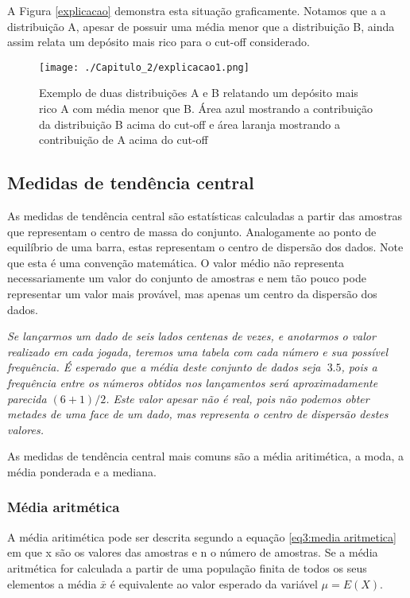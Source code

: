 A Figura \eqref{explicacao} demonstra esta situação graficamente. Notamos que a a distribuição A, apesar de possuir uma média menor que a distribuição B, ainda assim relata um depósito mais rico para o cut-off considerado. 

\FloatBarrier
\begin{figure}[!htb]
\centering
\texttt{[image: ./Capitulo\_2/explicacao1.png]}	
\caption{Exemplo de duas distribuições A e B relatando um depósito mais rico A com média menor que B. Área azul mostrando a contribuição da distribuição B acima do cut-off e área laranja mostrando a contribuição de A acima do cut-off}
\label{explicacao}
\end{figure}
\FloatBarrier

\subsection{Medidas de tendência central} 

As medidas de tendência central são estatísticas calculadas a partir das amostras que representam o centro de massa do conjunto. Analogamente ao ponto de equilíbrio de uma barra, estas representam o centro de dispersão dos dados. 
Note que esta é uma convenção matemática. O valor médio não representa necessariamente um valor do conjunto de amostras e nem tão pouco pode representar um valor mais provável, mas apenas um centro da dispersão dos dados.

\begin{proposition}
\textit{Se lançarmos um dado de seis lados centenas de vezes, e anotarmos o valor realizado em cada jogada, teremos uma tabela com cada número e sua possível frequência. É esperado que a média deste conjunto de dados seja $~3.5$, pois a frequência entre os números obtidos nos lançamentos será aproximadamente parecida $(6+1)/2$. Este valor apesar não é real, pois não podemos obter metades de uma face de um dado, mas representa o centro de dispersão destes valores.}  
\end{proposition}


As medidas de tendência central mais comuns são a média aritimética, a moda, a média ponderada e a mediana. 

\subsubsection{Média aritmética} 

A média aritimética pode ser descrita segundo a equação \eqref{eq3:media aritmetica} em que x são os valores das amostras e n o número de amostras. Se a média aritmética for calculada a partir de uma população finita de todos os seus elementos a média $\bar{x}$ é equivalente ao valor esperado da variável $\mu=E(X)$. 

